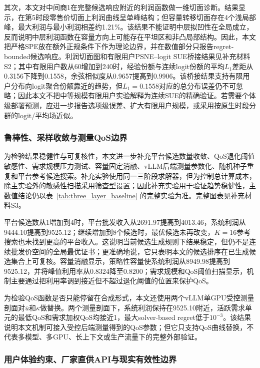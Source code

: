 \documentclass[UTF8,11pt]{ctexart}
\begin{document}
其次，本文对中间商1在完整候选响应附近的利润函数做一维切面诊断。结果显示，在第5时段零售价切面上利润曲线呈单峰结构；但容量转移切面存在4个浅局部峰，最大利润与最小利润相差约1.21\%。该结果不能证明中层拟凹性在全局成立，反而说明中层利润函数在容量方向上可能存在平坦区和非凸局部结构。因此，本文把严格SPE放在额外正规条件下作为理论边界，并在数值部分只报告regret-bounded候选响应。利润切面图和有限用户PSNE--logit SUE桥接结果见补充材料S2；其中有限用户数从60增加到240时，经验份额与连续logit份额的平均$L_1$差距从0.3156下降到0.1558，余弦相似度从0.9657提高到0.9906。该桥接结果支持有限用户分布向logit聚合份额靠近的趋势，但$L_1=0.1558$对应的总分布误差仍不可忽略；因此本文不把中等规模有限用户实验解释为连续SUE的精确验证。若需要个体级部署预测，应进一步报告选项级误差、扩大有限用户规模，或采用按原生时段分群的logit/平均场近似。

\subsubsection{鲁棒性、采样收敛与测量QoS边界}
\label{sec:robustness_ablation}

为检验结果稳健性与可复核性，本文进一步补充平台候选数量收敛、QoS退化阈值敏感性、需求规模压力测试、容量固定消融、vLLM后端测量参数化、随机种子重复和平台参考候选搜索。补充实验使用同一三阶段求解器，但为控制总计算成本，除主实验外的敏感性扫描采用筛查型设置；因此补充实验用于验证趋势稳健性，主数值结论仍以表~\ref{tab:three_layer_baseline} 的完整实验为准。完整图表见补充材料S3。

平台候选数从1增加到4时，平台批发收入从2691.97提高到4013.46，系统利润从9444.10提高到9525.12；继续增加到8个候选时，最优候选未再改变，$K=16$参考搜索也未找到更高的平台收入。这说明当前候选生成规则下结果稳定，但仍不是连续批发价空间的全局最优证书；更准确地说，它只表明本文的候选排序在已生成候选集合上可复核。容量消融显示，策略性容量使系统利润从8949.98提高到9525.12，并将峰值利用率从0.8324降至0.8200；需求规模和QoS阈值扫描显示，机制主要通过把利用率调到接近但不超过退化阈值的位置来保护QoS。

为检验QoS函数是否只能停留在合成形式，本文还使用两个vLLM单GPU受控测量剖面对$\bar u$和$\kappa$做替换。两个测量剖面下，系统利润保持在9525.10附近，活跃需求单元的最低QoS和需求加权QoS均接近1，最大solver-based regret低于$10^{-3}$。该结果说明本文机制可接入受控后端测量得到的QoS参数；但它只支持QoS曲线替换，不代表多模型、多GPU、长上下文或生产流量下的完整外部验证。

\subsubsection{用户体验约束、厂家直供API与现实有效性边界}
\label{sec:realism_validation}
\end{document}
